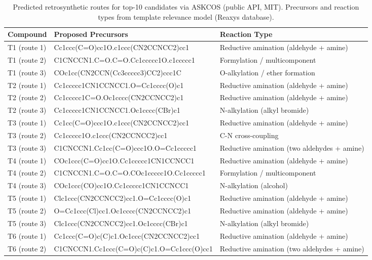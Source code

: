 \begin{table}[htbp]
\centering
\caption{Predicted retrosynthetic routes for top-10 candidates via ASKCOS (public API, MIT). Precursors and reaction types from template relevance model (Reaxys database).
\label{tab:sm_s20_retrosynthesis}}
\small
\begin{tabular}{l l l}
\toprule
Compound & Proposed Precursors & Reaction Type \\
\midrule
T1 (route 1) & Cc1ccc(C=O)cc1O.c1ccc(CN2CCNCC2)cc1 & Reductive amination (aldehyde + amine) \\
T1 (route 2) & C1CNCCN1.C=O.C=O.Cc1ccccc1O.c1ccccc1 & Formylation / multicomponent \\
T1 (route 3) & COc1cc(CN2CCN(Cc3ccccc3)CC2)ccc1C & O-alkylation / ether formation \\
T2 (route 1) & Cc1ccccc1CN1CCNCC1.O=Cc1cccc(O)c1 & Reductive amination (aldehyde + amine) \\
T2 (route 2) & Cc1ccccc1C=O.Oc1cccc(CN2CCNCC2)c1 & Reductive amination (aldehyde + amine) \\
T2 (route 3) & Cc1ccccc1CN1CCNCC1.Oc1cccc(CBr)c1 & N-alkylation (alkyl bromide) \\
T3 (route 1) & Cc1cc(C=O)ccc1O.c1ccc(CN2CCNCC2)cc1 & Reductive amination (aldehyde + amine) \\
T3 (route 2) & Cc1ccccc1O.c1ccc(CN2CCNCC2)cc1 & C-N cross-coupling \\
T3 (route 3) & C1CNCCN1.Cc1cc(C=O)ccc1O.O=Cc1ccccc1 & Reductive amination (two aldehydes + amine) \\
T4 (route 1) & COc1ccc(C=O)cc1O.Cc1ccccc1CN1CCNCC1 & Reductive amination (aldehyde + amine) \\
T4 (route 2) & C1CNCCN1.C=O.C=O.COc1ccccc1O.Cc1ccccc1 & Formylation / multicomponent \\
T4 (route 3) & COc1ccc(CO)cc1O.Cc1ccccc1CN1CCNCC1 & N-alkylation (alcohol) \\
T5 (route 1) & Clc1ccc(CN2CCNCC2)cc1.O=Cc1cccc(O)c1 & Reductive amination (aldehyde + amine) \\
T5 (route 2) & O=Cc1ccc(Cl)cc1.Oc1cccc(CN2CCNCC2)c1 & Reductive amination (aldehyde + amine) \\
T5 (route 3) & Clc1ccc(CN2CCNCC2)cc1.Oc1cccc(CBr)c1 & N-alkylation (alkyl bromide) \\
T6 (route 1) & Cc1ccc(C=O)c(C)c1.Oc1ccc(CN2CCNCC2)cc1 & Reductive amination (aldehyde + amine) \\
T6 (route 2) & C1CNCCN1.Cc1ccc(C=O)c(C)c1.O=Cc1ccc(O)cc1 & Reductive amination (two aldehydes + amine) \\

\end{tabular}
\end{table}
